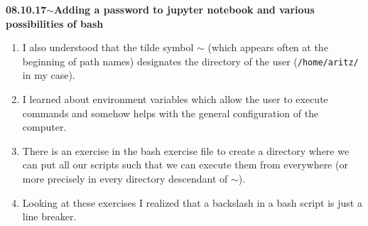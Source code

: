 \documentclass[11pt,a4paper]{article}
\newenvironment{loggentry}[2]%
{\noindent\textbf{#1}\hspace{1cm}$\mathbf{\sim}$\text{ }\textbf{#2}\\}{\vspace{0.5cm}}
\begin{document}
\begin{loggentry}{08.10.17}{Adding a password to jupyter notebook and various possibilities of bash}
\begin{enumerate}
\item I also understood that the tilde symbol $\sim$ (which appears often at the beginning of path names) designates the directory of the user (\texttt{/home/aritz/} in my case).
\item I learned about environment variables which allow the user to execute commands and somehow helps with the general configuration of the computer.
\item There is an exercise in the bash exercise file to create a directory where we can put all our scripts such that we can execute them from everywhere (or more precisely in every directory descendant of $\sim$).
\item Looking at these exercises I realized that a backslash in a bash script is just a line breaker.
\end{enumerate}
\end{loggentry}
\end{document}
